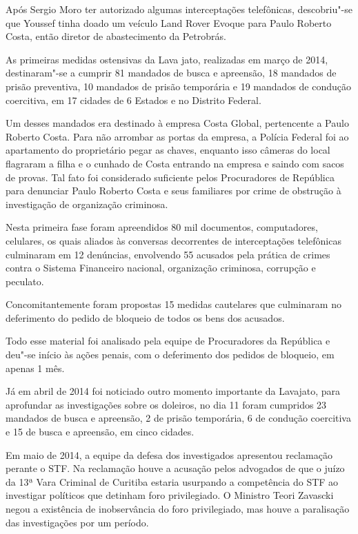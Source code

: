 {Após Sergio Moro ter autorizado algumas interceptações telefônicas,
descobriu"-se que Youssef tinha doado um veículo Land Rover Evoque para
Paulo Roberto Costa, então diretor de abastecimento da Petrobrás.

As primeiras medidas ostensivas da Lava jato, realizadas em março de
2014, destinaram"-se a cumprir 81 mandados de busca e apreensão, 18
mandados de prisão preventiva, 10 mandados de prisão temporária e 19
mandados de condução coercitiva, em 17 cidades de 6 Estados e no
Distrito Federal.

Um desses mandados era destinado à empresa Costa Global, pertencente a
Paulo Roberto Costa. Para não arrombar as portas da empresa, a Polícia
Federal foi ao apartamento do proprietário pegar as chaves, enquanto
isso câmeras do local flagraram a filha e o cunhado de Costa entrando na
empresa e saindo com sacos de provas. Tal fato foi considerado
suficiente pelos Procuradores de República para denunciar Paulo Roberto
Costa e seus familiares por crime de obstrução à investigação de
organização criminosa.

Nesta primeira fase foram apreendidos 80 mil documentos, computadores,
celulares, os quais aliados às conversas decorrentes de interceptações
telefônicas culminaram em 12 denúncias, envolvendo 55 acusados pela
prática de crimes contra o Sistema Financeiro nacional, organização
criminosa, corrupção e peculato.

Concomitantemente foram propostas 15 medidas cautelares que culminaram
no deferimento do pedido de bloqueio de todos os bens dos acusados.

Todo esse material foi analisado pela equipe de Procuradores da
República e deu"-se início às ações penais, com o deferimento dos pedidos
de bloqueio, em apenas 1 mês.

Já em abril de 2014 foi noticiado outro momento importante da Lavajato,
para aprofundar as investigações sobre os doleiros, no dia 11 foram
cumpridos 23 mandados de busca e apreensão, 2 de prisão temporária, 6 de
condução coercitiva e 15 de busca e apreensão, em cinco cidades.

Em maio de 2014, a equipe da defesa dos investigados apresentou
reclamação perante o STF. Na reclamação houve a acusação pelos advogados
de que o juízo da 13ª Vara Criminal de Curitiba estaria usurpando a
competência do STF ao investigar políticos que detinham foro
privilegiado. O Ministro Teori Zavascki negou a existência de
inobservância do foro privilegiado, mas houve a paralisação das
investigações por um período.

}
